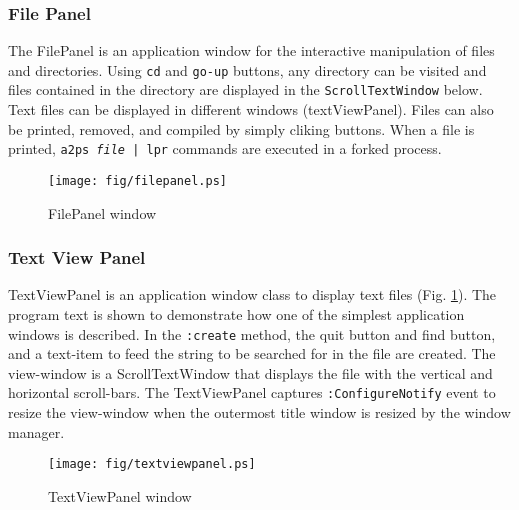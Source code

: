 \subsubsection{File Panel}
The FilePanel is an application window for the interactive  manipulation
of files and directories.
Using {\tt cd} and {\tt go-up} buttons, any directory can be visited
and files contained in the directory are displayed in the {\tt ScrollTextWindow}
below.
Text files can be displayed in different windows (textViewPanel).
Files can also be printed, removed, and compiled by simply cliking buttons.
When a file is printed, {\tt a2ps {\em file} | lpr} commands are executed
in a forked process.

\begin{figure}
\begin{center}
\texttt{[image: fig/filepanel.ps]}
\end{center}
\caption{FilePanel window}
\end{figure}

\subsubsection{Text View Panel}

TextViewPanel is an application window class to display text files
(Fig. \ref{textviewpanel}).
The program text is shown to demonstrate how 
one of the simplest application windows is described.
In the {\tt :create} method, the quit button and find button,
and a text-item to feed the string to be searched for in the file
are created.
The view-window is a ScrollTextWindow that displays the file
with the vertical and horizontal scroll-bars.
The TextViewPanel captures {\tt :ConfigureNotify} event
to resize the view-window when the outermost title window is resized
by the window manager.

\begin{figure}
\begin{center}
\texttt{[image: fig/textviewpanel.ps]}
\end{center}
\caption{TextViewPanel window\label{textviewpanel}}
\end{figure}

